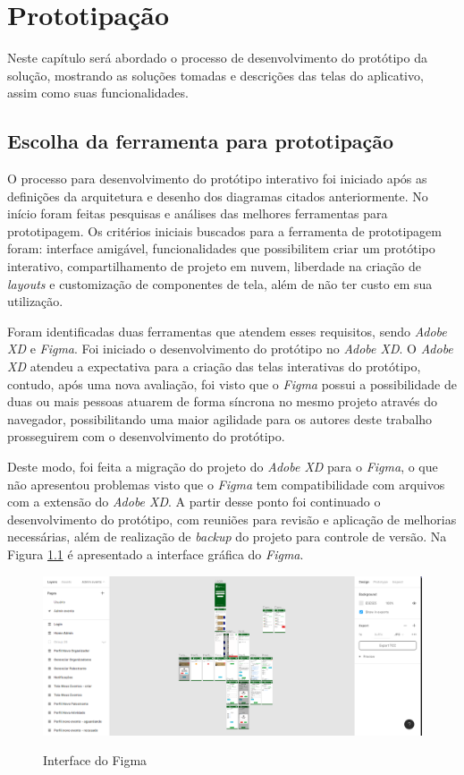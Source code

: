 \chapter{Prototipação}

Neste capítulo será abordado o processo de desenvolvimento do protótipo da solução, mostrando as soluções tomadas e descrições das telas do aplicativo, assim como suas funcionalidades.

\section{Escolha da ferramenta para prototipação}

O processo para desenvolvimento do protótipo interativo foi iniciado após as definições da arquitetura e desenho dos diagramas citados anteriormente. No início foram feitas pesquisas e análises das melhores ferramentas para prototipagem. Os critérios iniciais buscados para a ferramenta de prototipagem foram: interface amigável, funcionalidades que possibilitem criar um protótipo interativo, compartilhamento de projeto em nuvem, liberdade na criação de \textit{layouts} e customização de componentes de tela, além de não ter custo em sua utilização.

Foram identificadas duas ferramentas que atendem esses requisitos, sendo \textit{Adobe XD} e \textit{Figma}. Foi iniciado o desenvolvimento do protótipo no \textit{Adobe XD}. O \textit{Adobe XD} atendeu a expectativa para a criação das telas interativas do protótipo, contudo, após uma nova avaliação, foi visto que o \textit{Figma} possui a possibilidade de duas ou mais pessoas atuarem de forma síncrona no mesmo projeto através do navegador, possibilitando uma maior agilidade para os autores deste trabalho prosseguirem com o desenvolvimento do protótipo.

Deste modo, foi feita a migração do projeto do \textit{Adobe XD} para o \textit{Figma}, o que não apresentou problemas visto que o \textit{Figma} tem compatibilidade com arquivos com a extensão do \textit{Adobe XD}. A partir desse ponto foi continuado o desenvolvimento do protótipo, com reuniões para revisão e aplicação de melhorias necessárias, além de realização de \textit{backup} do projeto para controle de versão. Na Figura \ref{fig:figma} é apresentado a interface gráfica do \textit{Figma}.

\begin{figure}[H]
    \centering
    \caption{Interface do Figma}
    \includegraphics[scale=0.44]{figuras/figma.PNG}
    \label{fig:figma}
\end{figure}

